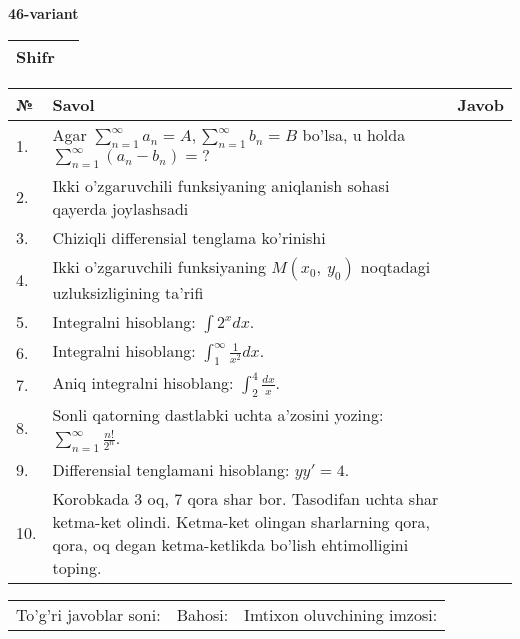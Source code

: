 \documentclass{article}
\begin{document}
  \egroup
  
  \newpage
  
  
  \textbf{46-variant}\\
  
  \bgroup
  \def\arraystretch{1.6} %
  
  \begin{tabular}{|m{5.7cm}|m{9.5cm}|}
  \hline
  Shifr & \\
  \hline
  \end{tabular}
  
  \vspace{1cm}
  
  \begin{tabular}{|m{0.7cm}|m{10cm}|m{4cm}|}
  \hline
  № & Savol & Javob \\
  \hline
  1. & Agar \(\sum_{n = 1}^{\infty}a_{n} = A,\sum_{n = 1}^{\infty}b_{n} = B\) bo'lsa, u holda \(\sum_{n = 1}^{\infty}\left( a_{n} - b_{n} \right) = ?\) &  \\
  \hline
  2. & Ikki o'zgaruvchili funksiyaning aniqlanish sohasi qayerda joylashsadi &  \\
  \hline
  3. & Chiziqli differensial tenglama ko'rinishi &  \\
  \hline
  4. & Ikki o'zgaruvchili funksiyaning \(M(x_{0},\ y_{0})\) noqtadagi uzluksizligining ta'rifi &  \\
  \hline
  5. & Integralni hisoblang: \(\int {2^{x}dx}\). &  \\
  \hline
  6. & Integralni hisoblang: \(\int_{1}^{\infty}{\frac{1}{x^{2}}dx}\). &  \\
  \hline
  7. & Aniq integralni hisoblang: \(\int_{2}^{4}\frac{dx}{x}\). &  \\
  \hline
  8. & Sonli qatorning dastlabki uchta a'zosini yozing: \(\sum_{n = 1}^{\infty}\frac{n!}{2^{n}}\). &  \\
  \hline
  9. & Differensial tenglamani hisoblang: \(yy' = 4\). &  \\
  \hline
  10. & Korobkada 3 oq, 7 qora shar bor. Tasodifan uchta shar ketma-ket olindi. Ketma-ket olingan sharlarning qora, qora, oq degan ketma-ketlikda bo'lish ehtimolligini toping. &  \\
  \hline
  \end{tabular}
  
  \vspace{1cm}
  
  \begin{tabular}{lll}
  To'g'ri javoblar soni: \underline{\hspace{1.5cm}} & 
  Bahosi: \underline{\hspace{1.5cm}} & 
  Imtixon oluvchining imzosi: \underline{\hspace{2cm}} \\
  \end{tabular}
  
\end{document}
